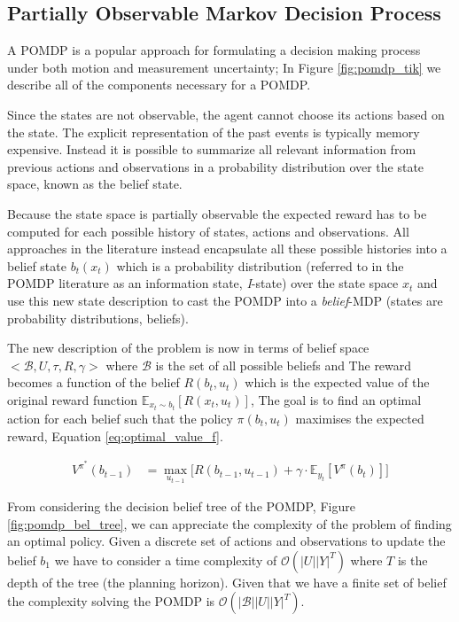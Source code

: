 \subsection{Partially Observable Markov Decision Process}

A POMDP is a popular approach for formulating a decision making process under both motion and measurement uncertainty;
In Figure \ref{fig:pomdp_tik} we describe all of the components necessary for a POMDP.

Since the states are not observable, the agent cannot choose its actions based on the state. The explicit 
representation of the past events is typically memory expensive. Instead it is possible to summarize all relevant 
information from previous actions and observations in a probability distribution over the state space, known as the
belief state. 


Because the state space is partially observable the expected reward has to be computed for each possible history of states, actions and observations.
All approaches in the literature instead encapsulate all these possible histories into a belief state $b_t(x_t)$ which is a 
probability distribution (referred to in the POMDP literature as an information state, \textit{I}-state) over the state space $x_t$ and use this 
new state description to cast the POMDP into a \textit{belief}-MDP (states are probability distributions, beliefs). 

The new description of the problem is now in terms of belief space $<\mathcal{B},U,\tau,R,\gamma>$ where $\mathcal{B}$ is the set of 
all possible beliefs and 
The reward becomes a function of the belief $R(b_t,u_t)$ which is the expected value of the original reward 
function $\mathbb{E}_{x_t \sim b_t}[R(x_t,u_t)]$, The goal is to find an optimal action for each belief such that 
the policy $\pi(b_t,u_t)$ maximises the expected reward, Equation \ref{eq:optimal_value_f}.

\begin{align}\label{eq:optimal_value_f}
 V^{\pi^*}(b_{t-1}) &= \max_{u_{t-1}} \bigg[ R(b_{t-1},u_{t-1}) + \gamma \cdot \mathbb{E}_{y_t}\left[ V^{\pi}(b_t)  \right] \bigg]
\end{align}

From considering the decision belief tree of the POMDP, Figure \ref{fig:pomdp_bel_tree}, we can appreciate the complexity of the problem
of finding an optimal policy. Given a discrete set of actions and observations to update the belief $b_1$ we have to consider a time 
complexity of $\mathcal{O}(|U||Y|^T)$ where $T$ is the depth of the tree (the planning horizon). Given that we have a finite set of 
belief the complexity solving the POMDP is $\mathcal{O}(|\mathcal{B}||U||Y|^T)$. 


